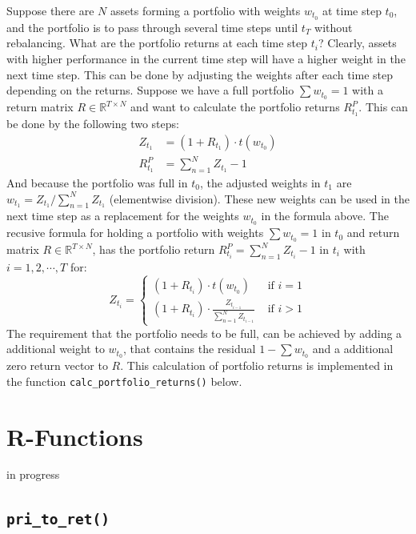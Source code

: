 \documentclass[
  oneside]{book}
\begin{document}
Suppose there are \(N\) assets forming a portfolio with weights \(w_{t_0}\) at time step \(t_0\), and the portfolio is to pass through several time steps until \(t_T\) without rebalancing. What are the portfolio returns at each time step \(t_i\)? Clearly, assets with higher performance in the current time step will have a higher weight in the next time step. This can be done by adjusting the weights after each time step depending on the returns. Suppose we have a full portfolio \(\textstyle\sum w_{t_0} = 1\) with a return matrix \(R \in \mathbb{R}^{T \times N}\) and want to calculate the portfolio returns \(R_{t_1}^P\). This can be done by the following two steps:
\begin{align*}
  Z_{t_1} &= (1+R_{t_1}) \cdot t(w_{t_0})\\
  R_{t_1}^P &= \sum_{n = 1}^N Z_{t_1} - 1
\end{align*}
And because the portfolio was full in \(t_0\), the adjusted weights in \(t_1\) are \(w_{t_1} = Z_{t_1}/\sum_{n = 1}^N Z_{t_1}\) (elementwise division). These new weights can be used in the next time step as a replacement for the weights \(w_{t_0}\) in the formula above. The recusive formula for holding a portfolio with weights \(\textstyle\sum w_{t_0} = 1\) in \(t_0\) and return matrix \(R \in \mathbb{R}^{T \times N}\), has the portfolio return \(R_{t_i}^P = \textstyle\sum_{n = 1}^N Z_{t_i} - 1\) in \(t_i\) with \(i=1, 2, \cdots, T\) for:
\[
  Z_{t_i} =
  \begin{cases}
  (1+R_{t_i})\cdot t(w_{t_0}) &\text{ if }i=1\\
  (1+R_{t_i})\cdot \frac{Z_{t_{i-1}}}{\sum_{n = 1}^N Z_{t_{i-1}}} &\text{ if }i>1
  \end{cases}
\]
The requirement that the portfolio needs to be full, can be achieved by adding a additional weight to \(w_{t_0}\), that contains the residual \(1-\textstyle\sum w_{t_0}\) and a additional zero return vector to \(R\). This calculation of portfolio returns is implemented in the function \texttt{calc\_portfolio\_returns()} below.

\hypertarget{r-functions-2}{%
\section{R-Functions}\label{r-functions-2}}

\textbar\textbar\textbar in progress\textbar\textbar\textbar{}\\

\hypertarget{pritoret}{%
\subsection{\texorpdfstring{\texttt{pri\_to\_ret()}}{pri\_to\_ret()}}\label{pritoret}}
\end{document}
